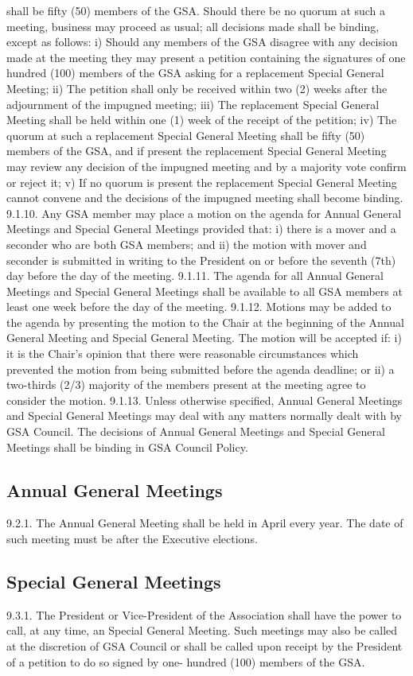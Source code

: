 shall be fifty (50) members of the GSA. Should there be no quorum at 
such a meeting, business may proceed as usual; all decisions made shall be binding, except as follows: 
i) Should any members of the GSA disagree with any decision made at 
the meeting they may present a petition containing the signatures of 
one hundred (100) members of the GSA asking for a replacement 
Special General Meeting; 
ii) The petition shall only be received within two (2) weeks after the 
adjournment of the impugned meeting; 
iii) The replacement Special General Meeting shall be held within one (1) 
week of the receipt of the petition; 
iv) The quorum at such a replacement Special General Meeting shall be 
fifty (50) members of the GSA, and if present the replacement Special 
General Meeting may review any decision of the impugned meeting 
and by a majority vote confirm or reject it; 
v) If no quorum is present the replacement Special General Meeting 
cannot convene and the decisions of the impugned meeting shall 
become binding. 
9.1.10. Any GSA member may place a motion on the agenda for Annual 
General Meetings and Special General Meetings provided that: 
i) there is a mover and a seconder who are both GSA members; and 
ii) the motion with mover and seconder is submitted in writing to the 
President on or before the seventh (7th) day before the day of the 
meeting. 
9.1.11. The agenda for all Annual General Meetings and Special General 
Meetings shall be available to all GSA members at least one week 
before the day of the meeting. 
9.1.12. Motions may be added to the agenda by presenting the motion to 
the Chair at the beginning of the Annual General Meeting and Special 
General Meeting. The motion will be accepted if: 
i) it is the Chair's opinion that there were reasonable circumstances 
which prevented the motion from being submitted before the agenda 
deadline; or 
ii) a two-thirds (2/3) majority of the members present at the meeting 
agree to consider the motion. 
9.1.13. Unless otherwise specified, Annual General Meetings and Special 
General Meetings may deal with any matters normally dealt with by 
GSA Council. The decisions of Annual General Meetings and Special 
General Meetings shall be binding in GSA Council Policy. 
\subsection{Annual General Meetings }
9.2.1. The Annual General Meeting shall be held in April every year. The 
date of such meeting must be after the Executive elections. 
\subsection{Special General Meetings }
9.3.1. The President or Vice-President of the Association shall have the 
power to call, at any time, an Special General Meeting. Such meetings 
may also be called at the discretion of GSA Council or shall be called 
upon receipt by the President of a petition to do so signed by one- 
hundred (100) members of the GSA. 
